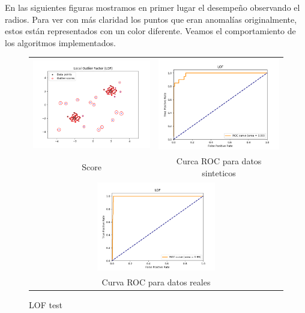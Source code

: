 En las siguientes figuras mostramos en primer lugar el desempeño observando el
radios. Para ver con más claridad los puntos que eran anomalías originalmente, 
estos están representados con un color diferente. Veamos el comportamiento de
los algoritmos implementados.




\begin{figure}[H]
    \begin{tabular}{cc}
      \includegraphics[width=65mm,height=40mm]{imagenes/lof-sintetico.png} &   \includegraphics[width=65mm,height=40mm]{imagenes/lof-sintetic-roc.png} \\
    Score & Curca ROC para datos sinteticos \\[6pt]
    \multicolumn{2}{c}{\includegraphics[width=65mm,height=39mm]{imagenes/lof-test.png} }\\
    \multicolumn{2}{c}{Curva ROC para datos reales}
    \end{tabular}
    \caption{\label{fig:loftest} LOF test}
\end{figure}


